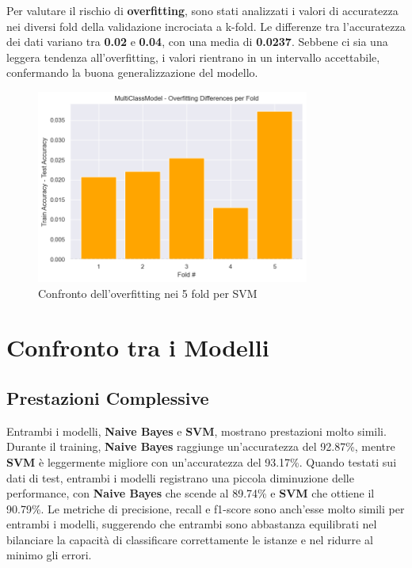 Per valutare il rischio di \textbf{overfitting}, sono stati analizzati i valori di accuratezza nei diversi fold della validazione incrociata a k-fold. Le differenze tra l'accuratezza dei dati variano tra \textbf{0.02} e \textbf{0.04}, con una media di \textbf{0.0237}. Sebbene ci sia una leggera tendenza all'overfitting, i valori rientrano in un intervallo accettabile, confermando la buona generalizzazione del modello.

\begin{figure}[H]
    \centering
    \includegraphics[width=0.8\textwidth]{images/overfitting_svm.png}
    \caption{Confronto dell'overfitting nei 5 fold per SVM}
    \label{fig:overfitting_svm}
\end{figure}

\newpage

\section{Confronto tra i Modelli}

\subsection{Prestazioni Complessive}

Entrambi i modelli, \textbf{Naive Bayes} e \textbf{SVM}, mostrano prestazioni molto simili. Durante il training, \textbf{Naive Bayes} raggiunge un'accuratezza del 92.87\%, mentre \textbf{SVM} è leggermente migliore con un'accuratezza del 93.17\%. Quando testati sui dati di test, entrambi i modelli registrano una piccola diminuzione delle performance, con \textbf{Naive Bayes} che scende al 89.74\% e \textbf{SVM} che ottiene il 90.79\%. Le metriche di precisione, recall e f1-score sono anch'esse molto simili per entrambi i modelli, suggerendo che entrambi sono abbastanza equilibrati nel bilanciare la capacità di classificare correttamente le istanze e nel ridurre al minimo gli errori.

